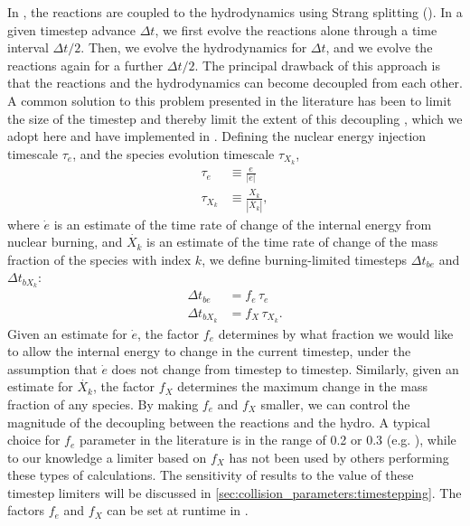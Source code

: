 \documentclass[12pt]{article}
\begin{document}
In \castro, the reactions are coupled to the hydrodynamics using Strang splitting (\citealt{strang:1968}).
In a given timestep advance $\Delta t$, we first evolve the reactions alone through
a time interval $\Delta t / 2$. Then, we evolve the hydrodynamics for $\Delta t$,
and we evolve the reactions again for a further $\Delta t / 2$. The principal
drawback of this approach is that the reactions and the hydrodynamics can become
decoupled from each other. A common solution to this problem presented in
the literature has been to limit the size of the timestep and thereby limit the
extent of this decoupling \citep{raskin:2010,hawley:2012}, which we adopt here
and have implemented in \castro. Defining the nuclear energy injection timescale
$\tau_e$, and the species evolution timescale $\tau_{X_k}$,
\begin{align}
  \tau_e &\equiv \frac{e}{|\dot{e}|} \\
  \tau_{X_k} &\equiv \frac{X_k}{|\dot{X_k}|},
\end{align}
where $\dot{e}$ is an estimate of the time rate of change of the internal energy
from nuclear burning, and $\dot{X_k}$ is an estimate of the time rate of change
of the mass fraction of the species with index $k$, we define burning-limited
timesteps $\Delta t_{be}$ and $\Delta t_{bX_k}$:
\begin{align}
  \Delta t_{be} &= f_{e}\, \tau_e \label{eq:timestep_e}\\
  \Delta t_{bX_k} &= f_{X}\, \tau_{X_k}. \label{eq:timestep_X}
\end{align}
Given an estimate for $\dot{e}$, the factor $f_{e}$ determines by what
fraction we would like to allow the internal energy to change
in the current timestep, under the assumption that $\dot{e}$ does not change from
timestep to timestep. Similarly, given an estimate for $\dot{X_k}$, the factor $f_{X}$
determines the maximum change in the mass fraction of any species. By making
$f_{e}$ and $f_{X}$ smaller, we can control the magnitude of the decoupling
between the reactions and the hydro. A typical choice for $f_e$ parameter in the
literature is in the range of 0.2 or 0.3 (e.g. \citealt{hawley:2012}), while to our knowledge a limiter based on
$f_X$ has not been used by others performing these types of calculations. The sensitivity
of results to the value of these timestep limiters will be discussed in
\autoref{sec:collision_parameters:timestepping}. The factors $f_{e}$ and $f_{X}$ can be set at runtime in \castro.
\end{document}
